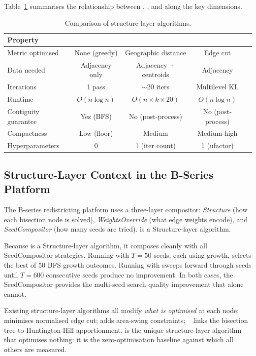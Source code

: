 Table~\ref{tab:comparison-algorithms} summarises the relationship between
\bfsg{}, \cvd{}, and \metis{} along the key dimensions.

\begin{table}[t]
\centering
\caption{Comparison of structure-layer algorithms.}
\label{tab:comparison-algorithms}
\begin{tabular}{lcccc}
\toprule
Property & \bfsg{} & \cvd{} & \metis{} \\
\midrule
Metric optimised & None (greedy) & Geographic distance & Edge cut \\
Data needed & Adjacency only & Adjacency + centroids & Adjacency \\
Iterations & 1 pass & $\sim$20 iters & Multilevel KL \\
Runtime & $O(n \log n)$ & $O(n \times k \times 20)$ & $O(n \log n)$ \\
Contiguity guarantee & Yes (BFS) & No (post-process) & No (post-process) \\
Compactness & Low (floor) & Medium & Medium-high \\
Hyperparameters & 0 & 1 (iter count) & 1 (ufactor) \\
\bottomrule
\end{tabular}
\end{table}

\subsection{Structure-Layer Context in the B-Series Platform}

The B-series redistricting platform uses a three-layer compositor:
\emph{Structure} (how each bisection node is solved),
\emph{WeightsOverride} (what edge weights encode), and
\emph{SeedCompositor} (how many seeds are tried).
\bfsg{} is a Structure-layer algorithm.

Because \bfsg{} is a Structure-layer algorithm, it composes cleanly with
all SeedCompositor strategies.
Running \be{} with $T=50$ seeds, each using \bfsg{} growth, selects the
best of 50 BFS growth outcomes.
Running \cs{} with \bfsg{} sweeps forward through seeds until $T=600$
consecutive seeds produce no improvement.
In both cases, the SeedCompositor provides the multi-seed search
quality improvement that \bfsg{} alone cannot.

Existing structure-layer algorithms all modify \emph{what is optimised}
at each node:
\geosec{}~\citep{b8paper} minimises normalised edge cut;
\areasec{} adds area-swing constraints;
\ar{}~\citep{b11paper} links the bisection tree to Huntington-Hill
apportionment.
\bfsg{} is the unique structure-layer algorithm that optimises nothing:
it is the zero-optimisation baseline against which all others are measured.
